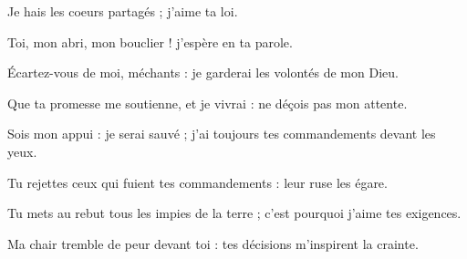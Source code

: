 \item Je hais les coeurs partagés ; j'aime ta loi.

\item Toi, mon abri, mon bouclier ! j'espère en ta parole.

\item Écartez-vous de moi, méchants : je garderai les volontés de mon Dieu.

\item Que ta promesse me soutienne, et je vivrai : ne déçois pas mon attente.

\item Sois mon appui : je serai sauvé ; j'ai toujours tes commandements devant les yeux.

\item Tu rejettes ceux qui fuient tes commandements : leur ruse les égare.

\item Tu mets au rebut tous les impies de la terre ; c'est pourquoi j'aime tes exigences.

\item Ma chair tremble de peur devant toi : tes décisions m'inspirent la crainte.
